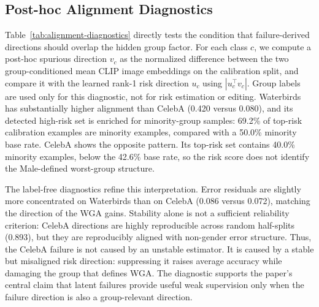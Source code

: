 \subsection{Post-hoc Alignment Diagnostics}
\begin{table}[t]
\centering
\caption{Diagnostics explaining why rank-1 latent-risk editing helps Waterbirds but hurts CelebA. Alignment is the average over classes of the absolute cosine similarity between the learned risk direction and a post-hoc spurious direction computed from group-labeled calibration embeddings. Risk-minority share uses the top 20\% calibration samples by class-conditional risk-direction score. Stability and concentration are label-free reliability diagnostics; WGA gain is measured on the test split against frozen CLIP.}
\label{tab:alignment-diagnostics}
\footnotesize
\setlength{\tabcolsep}{4.2pt}
\end{table}

Table~\ref{tab:alignment-diagnostics} directly tests the condition that failure-derived directions should overlap the hidden group factor. For each class \(c\), we compute a post-hoc spurious direction \(v_c\) as the normalized difference between the two group-conditioned mean CLIP image embeddings on the calibration split, and compare it with the learned rank-1 risk direction \(u_c\) using \(|u_c^\top v_c|\). Group labels are used only for this diagnostic, not for risk estimation or editing. Waterbirds has substantially higher alignment than CelebA (0.420 versus 0.080), and its detected high-risk set is enriched for minority-group samples: 69.2\% of top-risk calibration examples are minority examples, compared with a 50.0\% minority base rate. CelebA shows the opposite pattern. Its top-risk set contains 40.0\% minority examples, below the 42.6\% base rate, so the risk score does not identify the Male-defined worst-group structure.

The label-free diagnostics refine this interpretation. Error residuals are slightly more concentrated on Waterbirds than on CelebA (0.086 versus 0.072), matching the direction of the WGA gains. Stability alone is not a sufficient reliability criterion: CelebA directions are highly reproducible across random half-splits (0.893), but they are reproducibly aligned with non-gender error structure. Thus, the CelebA failure is not caused by an unstable estimator. It is caused by a stable but misaligned risk direction: suppressing it raises average accuracy while damaging the group that defines WGA. The diagnostic supports the paper's central claim that latent failures provide useful weak supervision only when the failure direction is also a group-relevant direction.
